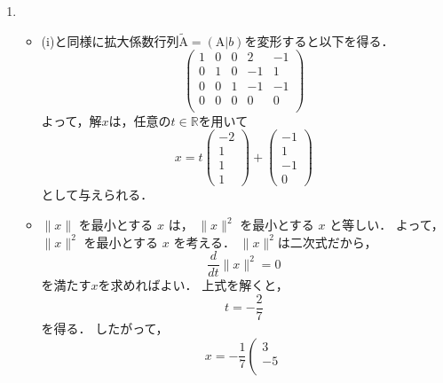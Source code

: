 \begin{enumerate}[label=問\arabic*.]
\begin{enumerate}[label=(\roman*)]
    \item
    \begin{itemize}
      \item (i)と同様に拡大係数行列$\tilde{\mathrm{A}} = (\mathrm{A}|b)$を変形すると以下を得る．
        \begin{equation}
          \left(
            \begin{array}{rrrr|r}
              1 & 0 & 0 &  2 & -1 \\
              0 & 1 & 0 & -1 &  1 \\
              0 & 0 & 1 & -1 & -1 \\
              0 & 0 & 0 &  0 &  0 \\
            \end{array}
          \right)
        \end{equation}
        よって，解$x$は，任意の$t \in \mathbb{R}$を用いて
        \begin{equation}
          x = t
            \left(
            \begin{array}{r}
              -2 \\ 1 \\ 1 \\ 1
            \end{array}
            \right)
            +
            \left(
            \begin{array}{r}
              -1 \\ 1 \\ -1 \\ 0
            \end{array}
            \right)
        \end{equation}
        として与えられる．
      \item $\|x\|$ を最小とする $x$ は，
      $\|x\|^2$ を最小とする $x$ と等しい．
      よって，$\|x\|^2$ を最小とする $x$ を考える．
      $\|x\|^2$は二次式だから，
      \begin{equation}
        \frac{d}{dt} \| x \|^2 = 0
      \end{equation}
      を満たす$x$を求めればよい．
      上式を解くと，
      \begin{equation}
        t = -\frac{2}{7}
      \end{equation}
      を得る．
      したがって，
      \begin{equation}
        x = -\frac{1}{7}
          \left(
          \begin{array}{r}
              3 \\
             -5 \\

\end{array}
\end{equation}
\end{itemize}
\end{enumerate}
\end{enumerate}
